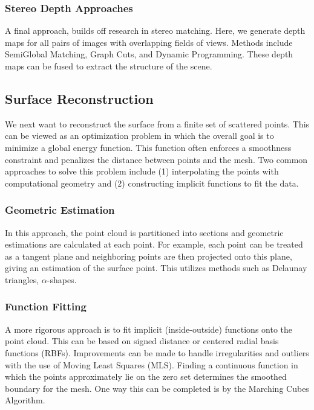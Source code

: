 \documentclass[10pt,twocolumn,letterpaper]{article}
\begin{document}
\subsubsection{Stereo Depth Approaches}

A final approach, builds off research in stereo matching. Here, we generate depth maps for all pairs of images with overlapping fields of views. Methods include SemiGlobal Matching, Graph Cuts, and Dynamic Programming.\cite{sgm,taxonomy} These depth maps can be fused to extract the structure of the scene.\cite{fuse}


\subsection{Surface Reconstruction}
We next want to reconstruct the surface from a finite set of scattered points.  This can be viewed as an optimization problem in which the overall goal is to minimize a global energy function. This function often enforces a smoothness constraint and penalizes the distance between points and the mesh.\cite{mesh_opt}  Two common approaches to solve this problem include (1) interpolating the points with computational geometry and (2) constructing implicit functions to fit the data.

\subsubsection{ Geometric Estimation }
In this approach, the point cloud is partitioned into sections and geometric estimations are calculated at each point. For example, each point can be treated as a tangent plane and neighboring points are then projected onto this plane, giving an estimation of the surface point.\cite{surface_review, hoppe1992surface}  This utilizes methods such as Delaunay triangles, $\alpha$-shapes. \cite{surface_review, poisson} 

\subsubsection{ Function Fitting}
A more rigorous approach is to fit implicit (inside-outside) functions onto the point cloud.  This can be based on signed distance or centered radial basis functions (RBFs).\cite{poisson}  Improvements can be made to handle irregularities and outliers with the use of Moving Least Squares (MLS).\cite{szeliski2010computer}  Finding a continuous function in which the points approximately lie on the zero set determines the smoothed boundary for the mesh.  One way this can be completed is by the Marching Cubes Algorithm.\cite{hoppe1992surface}
\end{document}
